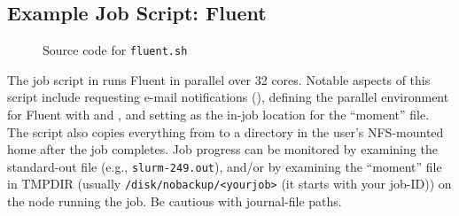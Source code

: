 \subsection{Example Job Script: Fluent}
\label{sect:example-fluent}

\begin{figure}[htpb]
  
  \caption{Source code for \texttt{fluent.sh}}
  \label{fig:fluent.sh}
\end{figure}

The job script in  runs Fluent in parallel over 32 cores.
Notable aspects of this script include requesting e-mail notifications (),
defining the parallel environment for Fluent with  and ,
and setting  as the in-job location for the ``moment''  file.
The script also copies everything from  to a directory in the user's NFS-mounted home after the job completes.
Job progress can be monitored by examining the standard-out file (e.g.,
\texttt{slurm-249.out}), and/or by examining the ``moment'' file in TMPDIR (usually
\texttt{/disk/nobackup/<yourjob>} (it starts with your job-ID)) on the node running
the job. Be cautious with journal-file paths.